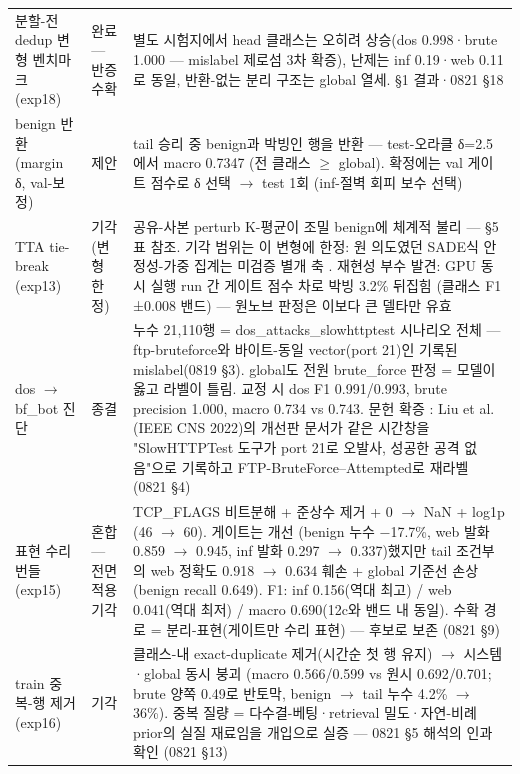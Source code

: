 \begin{longtable}
{}분할-전 dedup 변형 벤치마크 (exp18) & 완료 — 반증 수확 & 별도 시험지에서 head 클래스는 오히려 상승(dos 0.998·brute 1.000 — mislabel 제로섬 3차 확증), 난제는 inf 0.19·web 0.11로 동일, 반환-없는 분리 구조는 global 열세. §1 결과·0821 §18 \\
{}benign 반환 (margin δ, val-보정) & 제안 & tail 승리 중 benign과 박빙인 행을 반환 — test-오라클 δ=\allowbreak{}2.5에서 macro 0.7347 (전 클래스 \ensuremath{\geq} global). 확정에는 val 게이트 점수로 δ 선택  \ensuremath{\rightarrow}  test 1회 (inf-절벽 회피 보수 선택) \\
{}TTA tie-break (exp13) & 기각 (변형 한정) & 공유-사본 perturb K-평균이 조밀 benign에 체계적 불리 — §5 표 참조. 기각 범위는 이 변형에 한정: 원 의도였던 SADE식 안정성-가중 집계는 미검증 별개 축 . 재현성 부수 발견: GPU 동시 실행 run 간 게이트 점수 차로 박빙 3.2\% 뒤집힘 (클래스 F1 ±0.008 밴드) — 원노브 판정은 이보다 큰 델타만 유효 \\
{}dos \ensuremath{\rightarrow} bf\_\allowbreak{}bot 진단 & 종결 & 누수 21,110행 =\allowbreak{} dos\_\allowbreak{}attacks\_\allowbreak{}slowhttptest 시나리오 전체 — ftp-bruteforce와 바이트-동일 vector(port 21)인 기록된 mislabel(0819 §3). global도 전원 brute\_\allowbreak{}force 판정 =\allowbreak{} 모델이 옳고 라벨이 틀림. 교정 시 dos F1 0.991/\allowbreak{}0.993, brute precision 1.000, macro 0.734 vs 0.743. 문헌 확증 : Liu et al. (IEEE CNS 2022)의 개선판 문서가 같은 시간창을 "SlowHTTPTest 도구가 port 21로 오발사, 성공한 공격 없음"으로 기록하고 FTP-BruteForce–Attempted로 재라벨 (0821 §4) \\
{}표현 수리 번들 (exp15) & 혼합 — 전면 적용 기각 & TCP\_\allowbreak{}FLAGS 비트분해 +\allowbreak{} 준상수 제거 +\allowbreak{} 0 \ensuremath{\rightarrow} NaN +\allowbreak{} log1p (46 \ensuremath{\rightarrow} 60). 게이트는 개선 (benign 누수 −17.7\%, web 발화 0.859 \ensuremath{\rightarrow} 0.945, inf 발화 0.297 \ensuremath{\rightarrow} 0.337)했지만 tail 조건부의 web 정확도 0.918 \ensuremath{\rightarrow} 0.634 훼손 +\allowbreak{} global 기준선 손상(benign recall 0.649). F1: inf 0.156(역대 최고) /\allowbreak{} web 0.041(역대 최저) /\allowbreak{} macro 0.690(12c와 밴드 내 동일). 수확 경로 =\allowbreak{} 분리-표현(게이트만 수리 표현) — 후보로 보존 (0821 §9) \\
{}train 중복-행 제거 (exp16) & 기각 & 클래스-내 exact-duplicate 제거(시간순 첫 행 유지)  \ensuremath{\rightarrow}  시스템·global 동시 붕괴 (macro 0.566/\allowbreak{}0.599 vs 원시 0.692/\allowbreak{}0.701; brute 양쪽 0.49로 반토막, benign \ensuremath{\rightarrow} tail 누수 4.2\% \ensuremath{\rightarrow} 36\%). 중복 질량 =\allowbreak{} 다수결-베팅·retrieval 밀도·자연-비례 prior의 실질 재료임을 개입으로 실증 — 0821 §5 해석의 인과 확인 (0821 §13) \\

\end{longtable}

